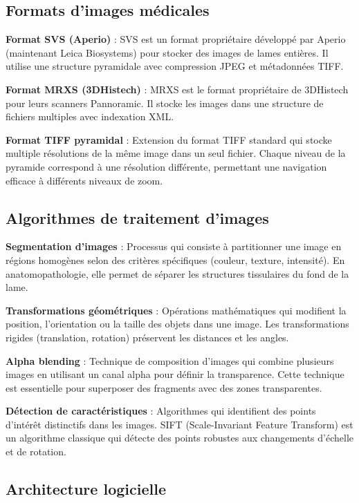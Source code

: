 \documentclass[12pt,a4paper]{report}
\begin{document}
\subsection{Formats d'images médicales}

\textbf{Format SVS (Aperio)} : SVS est un format propriétaire développé par Aperio (maintenant Leica Biosystems) pour stocker des images de lames entières. Il utilise une structure pyramidale avec compression JPEG et métadonnées TIFF.

\textbf{Format MRXS (3DHistech)} : MRXS est le format propriétaire de 3DHistech pour leurs scanners Pannoramic. Il stocke les images dans une structure de fichiers multiples avec indexation XML.

\textbf{Format TIFF pyramidal} : Extension du format TIFF standard qui stocke multiple résolutions de la même image dans un seul fichier. Chaque niveau de la pyramide correspond à une résolution différente, permettant une navigation efficace à différents niveaux de zoom.

\subsection{Algorithmes de traitement d'images}

\textbf{Segmentation d'images} : Processus qui consiste à partitionner une image en régions homogènes selon des critères spécifiques (couleur, texture, intensité). En anatomopathologie, elle permet de séparer les structures tissulaires du fond de la lame.

\textbf{Transformations géométriques} : Opérations mathématiques qui modifient la position, l'orientation ou la taille des objets dans une image. Les transformations rigides (translation, rotation) préservent les distances et les angles.

\textbf{Alpha blending} : Technique de composition d'images qui combine plusieurs images en utilisant un canal alpha pour définir la transparence. Cette technique est essentielle pour superposer des fragments avec des zones transparentes.

\textbf{Détection de caractéristiques} : Algorithmes qui identifient des points d'intérêt distinctifs dans les images. SIFT (Scale-Invariant Feature Transform) est un algorithme classique qui détecte des points robustes aux changements d'échelle et de rotation.

\subsection{Architecture logicielle}
\end{document}
